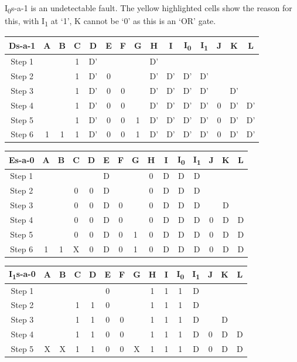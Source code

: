\documentclass[11pt]{report}
\begin{document}
I\textsubscript{0}s-a-1 is an undetectable fault. The yellow highlighted cells show the reason for this, with I\textsubscript{1} at `1', K cannot be `0' as this is an `OR' gate.

\begin{tabular}{ |c||c|c|c|c|c|c|c|c|c|c|c|c|c|c| }
\hline
\bf Ds-a-1 & \bf A & \bf B & \bf C & \bf D & \bf E & \bf F & G & H & I & I\textsubscript{0} & I\textsubscript{1} & J & K & \bf L \\
\hline
\hline
Step 1 & & & 1 & D' & & & & D' & & & & & & \\
\hline
Step 2 & & & 1 & D' & 0 & & & D' & D' & D' & D' & & & \\
\hline
Step 3 & & & 1 & D' & 0 & 0 & & D' & D' & D' & D' & & D' & \\
\hline
Step 4 & & & 1 & D' & 0 & 0 & & D' & D' & D' & D' & 0 & D' & D' \\
\hline
Step 5 & & & 1 & D' & 0 & 0 & 1 & D' & D' & D' & D' & 0 & D' & D' \\
\hline
Step 6 & 1 & 1 & 1 & D' & 0 & 0 & 1 & D' & D' & D' & D' & 0 & D' & D' \\
\hline
\end{tabular}



\begin{tabular}{ |c||c|c|c|c|c|c|c|c|c|c|c|c|c|c| }
\hline
\bf Es-a-0 & \bf A & \bf B & \bf C & \bf D & \bf E & \bf F & G & H & I & I\textsubscript{0} & I\textsubscript{1} & J & K & \bf L \\
\hline
\hline
Step 1 & & & & & D & & & 0 & D & D & D & & & \\
\hline
Step 2 & & & 0 & 0 & D & & & 0 & D & D & D & & & \\
\hline
Step 3 & & & 0 & 0 & D & 0 & & 0 & D & D & D & & D & \\
\hline
Step 4 & & & 0 & 0 & D & 0 & & 0 & D & D & D & 0 & D & D \\
\hline
Step 5 & & & 0 & 0 & D & 0 & 1 & 0 & D & D & D & 0 & D & D \\
\hline
Step 6 & 1 & 1 & X & 0 & D & 0 & 1 & 0 & D & D & D & 0 & D & D \\
\hline
\end{tabular}



\begin{tabular}{ |c||c|c|c|c|c|c|c|c|c|c|c|c|c|c| }
\hline
\bf I\textsubscript{1}s-a-0 & \bf A & \bf B & \bf C & \bf D & \bf E & \bf F & G & H & I & I\textsubscript{0} & I\textsubscript{1} & J & K & \bf L \\
\hline
\hline
Step 1 & & & & & 0 & & & 1 & 1 & 1 & D & & & \\
\hline
Step 2 & & & 1 & 1 & 0 & & & 1 & 1 & 1 & D & & & \\
\hline
Step 3 & & & 1 & 1 & 0 & 0 & & 1 & 1 & 1 & D & & D & \\
\hline
Step 4 & & & 1 & 1 & 0 & 0 & & 1 & 1 & 1 & D & 0 & D & D \\
\hline
Step 5 & X & X & 1 & 1 & 0 & 0 & X & 1 & 1 & 1 & D & 0 & D & D \\
\hline
\end{tabular}
\end{document}
